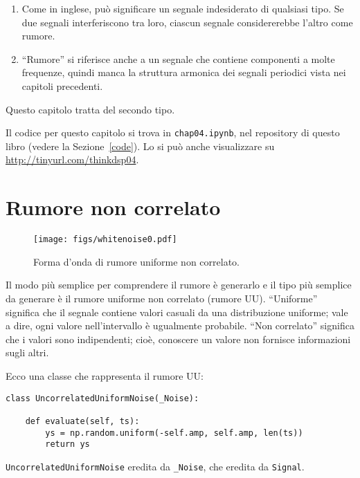 \documentclass[12pt]{book} \usepackage[width=5.5in,height=8.5in, hmarginratio=3:2,vmarginratio=1:1]{geometry}
\begin{document}
\begin{enumerate} 

\item Come in inglese, può significare un segnale indesiderato di qualsiasi tipo. Se due segnali interferiscono tra loro, ciascun segnale considererebbe l'altro come rumore.

\item ``Rumore'' si riferisce anche a un segnale che contiene componenti a molte frequenze, quindi manca la struttura armonica dei segnali periodici vista nei capitoli precedenti.

\end{enumerate} 

Questo capitolo tratta del secondo tipo.

Il codice per questo capitolo si trova in {\tt chap04.ipynb}, nel repository di questo libro (vedere la Sezione~\ref{code}). Lo si può anche visualizzare su \url{http://tinyurl.com/thinkdsp04}.

\section{Rumore non correlato} 

\begin{figure} 

\centerline{\texttt{[image: figs/whitenoise0.pdf]}} \caption{Forma d'onda di rumore uniforme non correlato.} \label{fig.whitenoise0} \end{figure} 

Il modo più semplice per comprendere il rumore è generarlo e il tipo più semplice da generare è il rumore uniforme non correlato (rumore UU). ``Uniforme'' significa che il segnale contiene valori casuali da una distribuzione uniforme; vale a dire, ogni valore nell'intervallo è ugualmente probabile. ``Non correlato'' significa che i valori sono indipendenti; cioè, conoscere un valore non fornisce informazioni sugli altri.

Ecco una classe che rappresenta il rumore UU:

\begin{verbatim} 
class UncorrelatedUniformNoise(_Noise):

    def evaluate(self, ts):
        ys = np.random.uniform(-self.amp, self.amp, len(ts))
        return ys
 \end{verbatim} 

{\tt UncorrelatedUniformNoise} eredita da \verb"_Noise", che eredita da {\tt Signal}.
\end{document}

